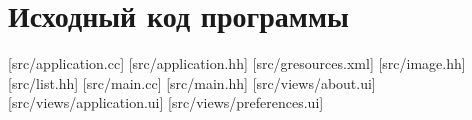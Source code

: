 \documentclass[variant=courcework]{bsuir}
\begin{document}












\appendix

\chapter[обязательное]{Исходный код программы}

[src/application.cc]
[src/application.hh]
[src/gresources.xml]
[src/image.hh]
[src/list.hh]
[src/main.cc]
[src/main.hh]
[src/views/about.ui]
[src/views/application.ui]
[src/views/preferences.ui]
\end{document}
